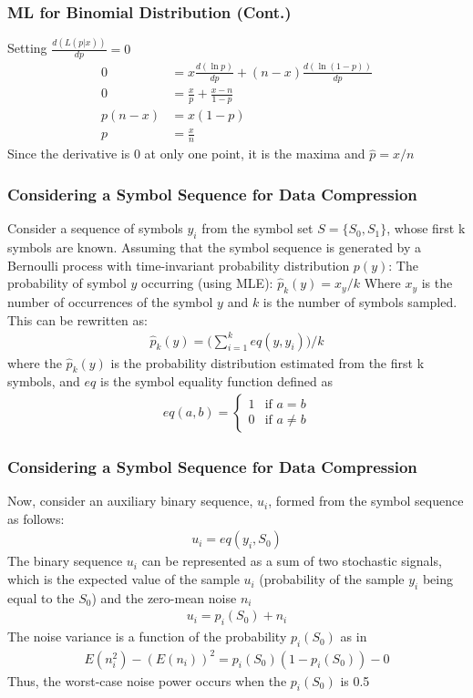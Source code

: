 \documentclass{beamer}
\begin{document}
\begin{frame}
\frametitle{ML for Binomial Distribution (Cont.)}
Setting $\frac{d(L(p|x))}{dp}=0$
\begin{align}
   0 &= x\frac{d(\ln p)}{dp} +(n-x)\frac{d(\ln(1-p))}{dp} \\
   0 &= \frac{x}{p} +\frac{x-n}{1-p} \\
  p(n-x) &= x(1-p) \\
  p &= \frac{x}{n}
\end{align}
Since the derivative is 0 at only one point, it is the maxima and $\hat{p} = x/n$
\end{frame}

\begin{frame}
\frametitle{Considering a Symbol Sequence for Data Compression}
Consider a sequence of symbols $y_i$ from the symbol set $S = \{S_0, S_1\}$, whose first k symbols are known. \newline Assuming that the symbol sequence is generated by a Bernoulli process with time-invariant probability distribution $p(y)$: 
\newline The probability of symbol $y$ occurring (using MLE): $\hat{p}_k(y) = x_y/k$ 
\newline Where $x_y$ is the number of occurrences of the symbol $y$ and $k$ is the number of symbols sampled. This can be rewritten as:
\begin{align}
    \hat{p}_k(y)=\bigg( \sum_{i=1}^keq(y,y_i) \bigg) / k
\end{align}
where the $\hat{p}_k(y)$ is the probability distribution estimated
from the first k symbols, and $eq$ is the symbol equality function defined as
\begin{align}
    eq(a,b) = \begin{cases} 1 &\mbox{if } a = b \\ 
0 & \mbox{if } a \neq b \end{cases}
\end{align}
\end{frame}

\begin{frame}
\frametitle{Considering a Symbol Sequence for Data Compression}
Now, consider an auxiliary binary sequence, $u_i$, formed from the symbol sequence as follows:
\begin{align}
    u_i =eq(y_i,S_0)
\end{align}
The binary sequence $u_i$ can be represented as a sum of two stochastic signals, which is the expected value of the sample $u_i$ (probability of the sample $y_i$ being equal to the $S_0$) and the zero-mean noise $n_i$
\begin{align}
    u_i =p_i(S_0)+n_i
\end{align}
The noise variance is a function of the probability $p_i(S_0)$ as in
\begin{align}
    E(n_i^2)-{(E(n_i))}^2 = p_i(S_0)(1-p_i(S_0))-0
\end{align}
Thus, the worst-case noise power occurs when the $p_i(S_0)$ is 0.5
\end{frame}
\end{document}

